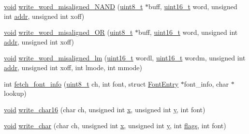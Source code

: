 \begin{DoxyCompactItemize}
\item 
\hyperlink{group___n_a_m_e_ga18028b8badbf1ea7e704ccac3c488e82}{void} \hyperlink{group___o_s_d_g_e_n_module_gac311d0b8a75e018101c2f7de25468bce}{write\-\_\-word\-\_\-misaligned\-\_\-\-N\-A\-N\-D} (\hyperlink{stdint_8h_aba7bc1797add20fe3efdf37ced1182c5}{uint8\-\_\-t} $\ast$buff, \hyperlink{stdint_8h_a273cf69d639a59973b6019625df33e30}{uint16\-\_\-t} word, unsigned int \hyperlink{group___c_m_s_i_s___core___instruction_interface_gae5c31572d72f992f107a67f7c4e80d5b}{addr}, unsigned int xoff)
\item 
\hyperlink{group___n_a_m_e_ga18028b8badbf1ea7e704ccac3c488e82}{void} \hyperlink{group___o_s_d_g_e_n_module_ga17f327de483285ee88a844c5b617d1ed}{write\-\_\-word\-\_\-misaligned\-\_\-\-O\-R} (\hyperlink{stdint_8h_aba7bc1797add20fe3efdf37ced1182c5}{uint8\-\_\-t} $\ast$buff, \hyperlink{stdint_8h_a273cf69d639a59973b6019625df33e30}{uint16\-\_\-t} word, unsigned int \hyperlink{group___c_m_s_i_s___core___instruction_interface_gae5c31572d72f992f107a67f7c4e80d5b}{addr}, unsigned int xoff)
\item 
\hyperlink{group___n_a_m_e_ga18028b8badbf1ea7e704ccac3c488e82}{void} \hyperlink{group___o_s_d_g_e_n_module_gaf7b6f5e5e2980741c80f92a24c27d470}{write\-\_\-word\-\_\-misaligned\-\_\-lm} (\hyperlink{stdint_8h_a273cf69d639a59973b6019625df33e30}{uint16\-\_\-t} wordl, \hyperlink{stdint_8h_a273cf69d639a59973b6019625df33e30}{uint16\-\_\-t} wordm, unsigned int \hyperlink{group___c_m_s_i_s___core___instruction_interface_gae5c31572d72f992f107a67f7c4e80d5b}{addr}, unsigned int xoff, int lmode, int mmode)
\item 
int \hyperlink{group___o_s_d_g_e_n_module_ga77bb4c9fa18481a38a30c22fc2b8ad68}{fetch\-\_\-font\-\_\-info} (\hyperlink{stdint_8h_aba7bc1797add20fe3efdf37ced1182c5}{uint8\-\_\-t} ch, int font, struct \hyperlink{struct_font_entry}{Font\-Entry} $\ast$font\-\_\-info, char $\ast$lookup)
\item 
\hyperlink{group___n_a_m_e_ga18028b8badbf1ea7e704ccac3c488e82}{void} \hyperlink{group___o_s_d_g_e_n_module_gaa298c555d34c7e1929c065b647c0f2c8}{write\-\_\-char16} (char ch, unsigned int \hyperlink{pios__opahrs__proto_8h_ad0da36b2558901e21e7a30f6c227a45e}{x}, unsigned int \hyperlink{pios__opahrs__proto_8h_aa4f0d3eebc3c443f9be81bf48561a217}{y}, int font)
\item 
\hyperlink{group___n_a_m_e_ga18028b8badbf1ea7e704ccac3c488e82}{void} \hyperlink{group___o_s_d_g_e_n_module_ga790a5ed0b4f266fd6699d69102a632f4}{write\-\_\-char} (char ch, unsigned int \hyperlink{pios__opahrs__proto_8h_ad0da36b2558901e21e7a30f6c227a45e}{x}, unsigned int \hyperlink{pios__opahrs__proto_8h_aa4f0d3eebc3c443f9be81bf48561a217}{y}, int \hyperlink{group___u_a_v_ga89997860157be94711355010fc2a337d}{flags}, int font)

\end{DoxyCompactItemize}
